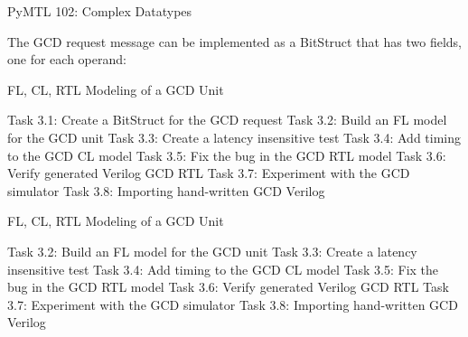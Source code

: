 \begin{frame}{PyMTL 102: Complex Datatypes}

The GCD request message can be implemented as a BitStruct that has two
fields, one for each operand:

\vspace{.2in}
\end{frame}


\begin{frame}{ FL, CL, RTL Modeling of a GCD Unit}
\begin{cbxlist}
  \1 Task 3.1: Create a BitStruct for the GCD request
  \1 Task 3.2: Build an FL model for the GCD unit
  \1 Task 3.3: Create a latency insensitive test
  \1 Task 3.4: Add timing to the GCD CL model
  \1 Task 3.5: Fix the bug in the GCD RTL model
  \1 Task 3.6: Verify generated Verilog GCD RTL
  \1 Task 3.7: Experiment with the GCD simulator
  \1 Task 3.8: Importing hand-written GCD Verilog
\end{cbxlist}
\end{frame}

\begin{frame}{ FL, CL, RTL Modeling of a GCD Unit}
\begin{cbxlist}
  \1 
  \1 Task 3.2: Build an FL model for the GCD unit
  \1 Task 3.3: Create a latency insensitive test
  \1 Task 3.4: Add timing to the GCD CL model
  \1 Task 3.5: Fix the bug in the GCD RTL model
  \1 Task 3.6: Verify generated Verilog GCD RTL
  \1 Task 3.7: Experiment with the GCD simulator
  \1 Task 3.8: Importing hand-written GCD Verilog
\end{cbxlist}
\end{frame}

